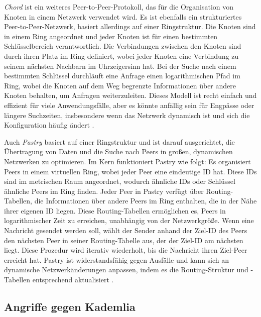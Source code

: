 \textit{Chord} ist ein weiteres Peer-to-Peer-Protokoll, das für die Organisation von Knoten in einem Netzwerk verwendet wird. Es ist ebenfalls ein strukturiertes Peer-to-Peer-Netzwerk, basiert allerdings auf einer Ringstruktur. Die Knoten sind in einem Ring angeordnet und jeder Knoten ist für einen bestimmten Schlüsselbereich verantwortlich. Die Verbindungen zwischen den Knoten sind durch ihren Platz im Ring definiert, wobei jeder Knoten eine Verbindung zu seinem nächsten Nachbarn im Uhrzeigersinn hat. Bei der Suche nach einem bestimmten Schlüssel durchläuft eine Anfrage einen logarithmischen Pfad im Ring, wobei die Knoten auf dem Weg begrenzte Informationen über andere Knoten behalten, um Anfragen weiterzuleiten. Dieses Modell ist recht einfach und effizient für viele Anwendungsfälle, aber es könnte anfällig sein für Engpässe oder längere Suchzeiten, insbesondere wenn das Netzwerk dynamisch ist und sich die Konfiguration häufig ändert \parencite[S. 1-2]{Stoica_Chord}.

Auch \textit{Pastry} basiert auf einer Ringstruktur und ist darauf ausgerichtet, die Übertragung von Daten und die Suche nach Peers in großen, dynamischen Netzwerken zu optimieren. Im Kern funktioniert Pastry wie folgt: Es organisiert Peers in einem virtuellen Ring, wobei jeder Peer eine eindeutige ID hat. Diese IDs sind im metrischen Raum angeordnet, wodurch ähnliche IDs oder Schlüssel ähnliche Peers im Ring finden. Jeder Peer in Pastry verfügt über Routing-Tabellen, die Informationen über andere Peers im Ring enthalten, die in der Nähe ihrer eigenen ID liegen. Diese Routing-Tabellen ermöglichen es, Peers in logarithmischer Zeit zu erreichen, unabhängig von der Netzwerkgröße. Wenn eine Nachricht gesendet werden soll, wählt der Sender anhand der Ziel-ID des Peers den nächsten Peer in seiner Routing-Tabelle aus, der der Ziel-ID am nächsten liegt. Diese Prozedur wird iterativ wiederholt, bis die Nachricht ihren Ziel-Peer erreicht hat. Pastry ist widerstandsfähig gegen Ausfälle und kann sich an dynamische Netzwerkänderungen anpassen, indem es die Routing-Struktur und -Tabellen entsprechend aktualisiert \parencite[S. 331-339]{Rowstron_Pastry}.


\subsection{Angriffe gegen Kademlia}






